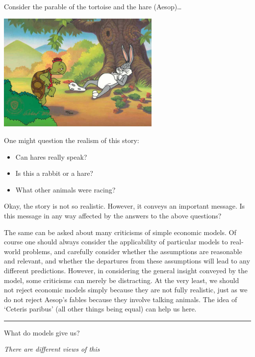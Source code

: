 \documentclass[]{article}
\begin{document}
Consider the parable of the tortoise and the hare (Aesop)\ldots{}

\medskip

\includegraphics[height=2.3in]{picsfigs/tortoisehare.jpg}

\bigskip

\footnotesize

One might question the realism of this story:

\begin{itemize}
\item
  Can hares really speak?
\item
  Is this a rabbit or a hare?
\item
  What other animals were racing?
\end{itemize}

Okay, the story is not so realistic. However, it conveys an important message. Is this message in any way affected by the answers to the above questions?

The same can be asked about many criticisms of simple economic models. Of course one should always consider the applicability of particular models to real-world problems, and carefully consider whether the assumptions are reasonable and relevant, and whether the departures from these assumptions will lead to any different predictions. However, in considering the general insight conveyed by the model, some criticisms can merely be distracting. At the very least, we should not reject economic models simply because they are not fully realistic, just as we do not reject Aesop's fables because they involve talking animals. The idea of `Ceteris paribus' (all other things being equal) can help us here.

\begin{center}\rule{0.5\linewidth}{\linethickness}\end{center}

What do models give us?

\emph{\textcolor{OliveGreen}{There are different views of this}}
\end{document}
